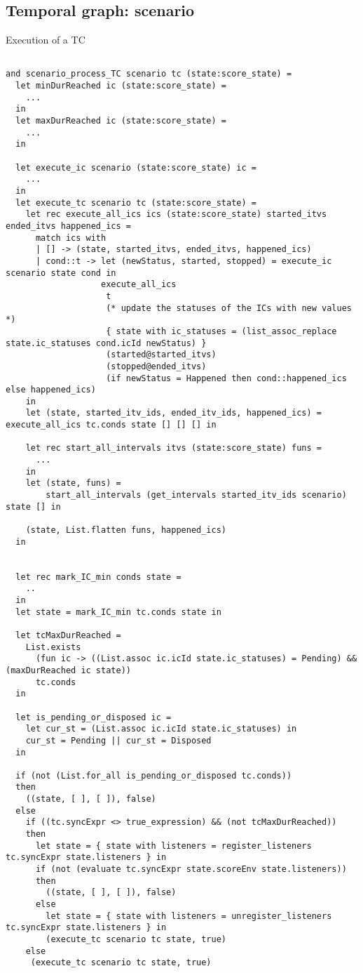 \documentclass[applsci,article,submit,moreauthors,pdftex,10pt,a4paper]{mdpi}
\begin{document}
\subsection{Temporal graph: scenario}\label{sec.scenario}
Execution of a TC
\begin{lstlisting}

and scenario_process_TC scenario tc (state:score_state) =
  let minDurReached ic (state:score_state) =
    ...
  in
  let maxDurReached ic (state:score_state) =
    ...
  in

  let execute_ic scenario (state:score_state) ic =
    ...
  in
  let execute_tc scenario tc (state:score_state) =
    let rec execute_all_ics ics (state:score_state) started_itvs ended_itvs happened_ics =
      match ics with
      | [] -> (state, started_itvs, ended_itvs, happened_ics)
      | cond::t -> let (newStatus, started, stopped) = execute_ic scenario state cond in
                   execute_all_ics
                    t
                    (* update the statuses of the ICs with new values *)
                    { state with ic_statuses = (list_assoc_replace state.ic_statuses cond.icId newStatus) }
                    (started@started_itvs)
                    (stopped@ended_itvs)
                    (if newStatus = Happened then cond::happened_ics else happened_ics)
    in
    let (state, started_itv_ids, ended_itv_ids, happened_ics) = execute_all_ics tc.conds state [] [] [] in

    let rec start_all_intervals itvs (state:score_state) funs = 
      ...
    in
    let (state, funs) =
        start_all_intervals (get_intervals started_itv_ids scenario) state [] in

    (state, List.flatten funs, happened_ics)
  in


  let rec mark_IC_min conds state =
    ..
  in
  let state = mark_IC_min tc.conds state in

  let tcMaxDurReached =
    List.exists
      (fun ic -> ((List.assoc ic.icId state.ic_statuses) = Pending) && (maxDurReached ic state))
      tc.conds
  in

  let is_pending_or_disposed ic =
    let cur_st = (List.assoc ic.icId state.ic_statuses) in
    cur_st = Pending || cur_st = Disposed
  in
  
  if (not (List.for_all is_pending_or_disposed tc.conds))
  then
    ((state, [ ], [ ]), false)
  else
    if ((tc.syncExpr <> true_expression) && (not tcMaxDurReached))
    then
      let state = { state with listeners = register_listeners tc.syncExpr state.listeners } in
      if (not (evaluate tc.syncExpr state.scoreEnv state.listeners))
      then      
        ((state, [ ], [ ]), false)
      else
        let state = { state with listeners = unregister_listeners tc.syncExpr state.listeners } in        
        (execute_tc scenario tc state, true)
    else    
     (execute_tc scenario tc state, true)

\end{lstlisting}
\end{document}

